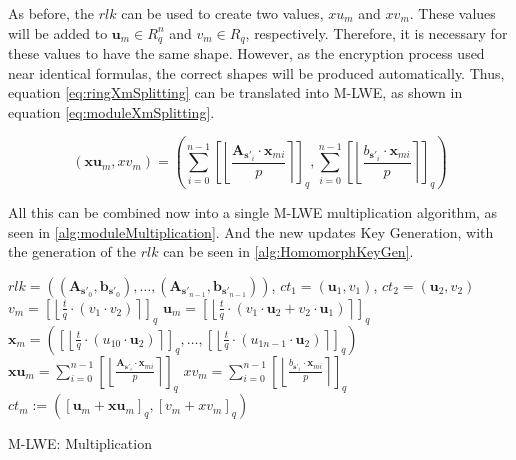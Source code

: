 As before, the $rlk$ can be used to create two values, $xu_m$ and $xv_m$. These values will be added to $\textbf{u}_m \in R^n_q$ and $v_m \in R_q$, respectively. Therefore, it is necessary for these values to have the same shape. However, as the encryption process used near identical formulas, the correct shapes will be produced automatically. Thus, equation \ref{eq:ringXmSplitting} can be translated into M-LWE, as shown in equation \ref{eq:moduleXmSplitting}.

\begin{equation}
  (\textbf{xu}_m, xv_m) = \left(\sum_{i=0}^{n-1}\left[\left\lfloor\frac{\textbf{A}_{\textbf{s}'_i} \cdot \textbf{x}_{mi}}{p}  \right\rceil \right]_q, \sum_{i=0}^{n-1}\left[\left\lfloor \frac{b_{\textbf{s}'_i} \cdot \textbf{x}_{mi}}{p}  \right\rceil \right]_q\right)
  \label{eq:moduleXmSplitting}
\end{equation}

All this can be combined now into a single M-LWE multiplication algorithm, as seen in \ref{alg:moduleMultiplication}. And the new updates Key Generation, with the generation of the $rlk$ can be seen in \ref{alg:HomomorphKeyGen}.

\begin{algorithm}[htb]
  \begin{algorithmic}[1]
    \REQUIRE $rlk=((\textbf{A}_{\textbf{s}'_0}, \textbf{b}_{\textbf{s}'_0}), \ldots ,(\textbf{A}_{\textbf{s}'_{n-1}}, \textbf{b}_{\textbf{s}'_{n-1}}))$, $ct_1 = (\textbf{u}_1, v_1)$, $ct_2 = (\textbf{u}_2, v_2)$
    \STATE $v_m = \left[\left\lfloor \frac{t}{q}\cdot (v_1 \cdot v_2)\right\rceil\right] _q $
    \STATE $\textbf{u}_m = \left[\left\lfloor \frac{t}{q}\cdot(v_1 \cdot \textbf{u}_2 + v_2 \cdot \textbf{u}_1)\right\rceil\right] _q$
    \STATE $\textbf{x}_m = \left(\left[\left\lfloor \frac{t}{q}\cdot(u_{10} \cdot \textbf{u}_2)\right\rceil\right]_q,\ldots, \left[\left\lfloor \frac{t}{q}\cdot(u_{1n-1} \cdot \textbf{u}_2)\right\rceil\right]_q\right) $
    \STATE $\textbf{xu}_m = \sum_{i=0}^{n-1}\left[\left\lfloor\frac{\textbf{A}_{\textbf{s}'_i} \cdot \textbf{x}_{mi}}{p}  \right\rceil \right]_q$
    \STATE $xv_m = \sum_{i=0}^{n-1}\left[\left\lfloor \frac{b_{\textbf{s}'_i} \cdot \textbf{x}_{mi}}{p}  \right\rceil \right]_q$
    \RETURN $ct_m:=(\left[\textbf{u}_m + \textbf{xu}_m\right]_q , \left[v_m + xv_m\right]_q )$
  \end{algorithmic}
  \caption{M-LWE: Multiplication}
  \label{alg:moduleMultiplication}
\end{algorithm}


